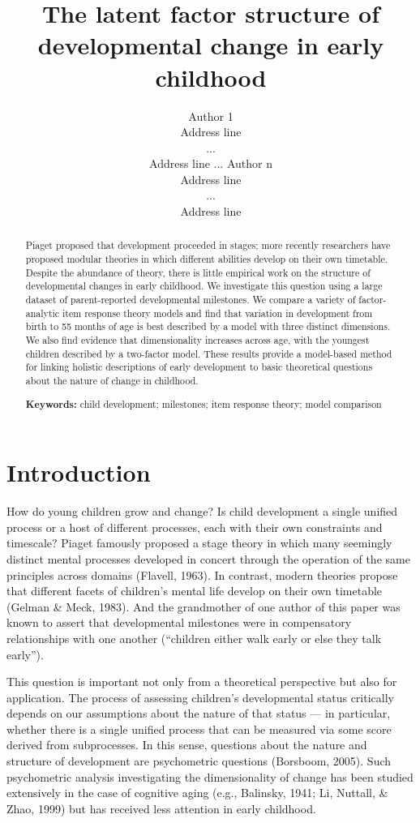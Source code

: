 \documentclass[10pt, letterpaper]{article}
\title{The latent factor structure of developmental change in early childhood}
\author{Author 1 \\ Address line \\  ... \\ Address line
    \And  ... \And
    Author n \\ Address line \\ ... \\ Address line}
\begin{document}
\maketitle

\begin{abstract}
Piaget proposed that development proceeded in stages; more recently
researchers have proposed modular theories in which different abilities
develop on their own timetable. Despite the abundance of theory, there
is little empirical work on the structure of developmental changes in
early childhood. We investigate this question using a large dataset of
parent-reported developmental milestones. We compare a variety of
factor-analytic item response theory models and find that variation in
development from birth to 55 months of age is best described by a model
with three distinct dimensions. We also find evidence that
dimensionality increases across age, with the youngest children
described by a two-factor model. These results provide a model-based
method for linking holistic descriptions of early development to basic
theoretical questions about the nature of change in childhood.

\textbf{Keywords:}
child development; milestones; item response theory; model comparison
\end{abstract}

\hypertarget{introduction}{%
\section{Introduction}\label{introduction}}

How do young children grow and change? Is child development a single
unified process or a host of different processes, each with their own
constraints and timescale? Piaget famously proposed a stage theory in
which many seemingly distinct mental processes developed in concert
through the operation of the same principles across domains (Flavell,
1963). In contrast, modern theories propose that different facets of
children's mental life develop on their own timetable (Gelman \& Meck,
1983). And the grandmother of one author of this paper was known to
assert that developmental milestones were in compensatory relationships
with one another (``children either walk early or else they talk
early'').

This question is important not only from a theoretical perspective but
also for application. The process of assessing children's developmental
status critically depends on our assumptions about the nature of that
status --- in particular, whether there is a single unified process that
can be measured via some score derived from subprocesses. In this sense,
questions about the nature and structure of development are psychometric
questions (Borsboom, 2005). Such psychometric analysis investigating the
dimensionality of change has been studied extensively in the case of
cognitive aging (e.g., Balinsky, 1941; Li, Nuttall, \& Zhao, 1999) but
has received less attention in early childhood.
\end{document}
